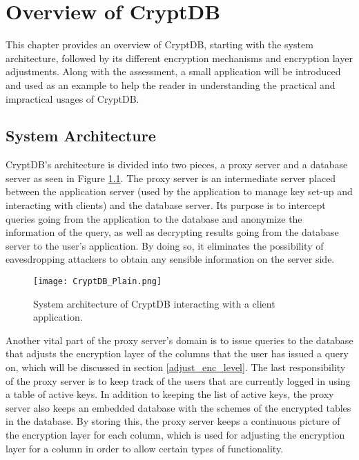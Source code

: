 \chapter{Overview of CryptDB}
\label{chp:overview_cryptDB}

This chapter provides an overview of CryptDB, starting with the system architecture, followed by its different encryption mechanisms and encryption layer adjustments. Along with the assessment, a small application will be introduced and used as an example to help the reader in understanding the practical and impractical usages of CryptDB.

\section{System Architecture}
\label{sec:sysarc}

CryptDB's architecture is divided into two pieces, a proxy server and a database server as seen in Figure \ref{cryptdb_plain}. The proxy server is an intermediate server placed between the application server (used by the application to manage key set-up and interacting with clients) and the database server. Its purpose is to intercept queries going from the application to the database and anonymize the information of the query, as well as decrypting results going from the database server to the user's application. By doing so, it eliminates the possibility of eavesdropping attackers to obtain any sensible information on the server side.

\begin{figure}[H]
	\texttt{[image: CryptDB\_Plain.png]}
	\caption{System architecture of CryptDB interacting with a client application.}
	\label{cryptdb_plain}
\end{figure}

Another vital part of the proxy server's domain is to issue queries to the database that adjusts the encryption layer of the columns that the user has issued a query on, which will be discussed in section \ref{adjust_enc_level}. The last responsibility of the proxy server is to keep track of the users that are currently logged in using a table of active keys. In addition to keeping the list of active keys, the proxy server also keeps an embedded database with the schemes of the encrypted tables in the database. By storing this, the proxy server keeps a continuous picture of the encryption layer for each column, which is used for adjusting the encryption layer for a column in order to allow certain types of functionality.

